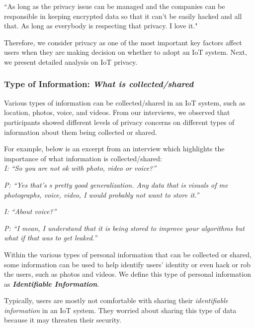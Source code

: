 ``As long as the privacy issue can be managed and the companies can be responsible in keeping encrypted data so that it can't be easily hacked and all that. As long as everybody is respecting that privacy. I love it." 

Therefore, we consider privacy as one of the most important key factors affect users when they are making decision on whether to adopt an IoT system. Next, we present detailed analysis on IoT privacy.

\subsubsection{Type of Information: \textit{What is collected/shared}}
Various types of information can be collected/shared in an IoT system, such as location, photos, voice, and videos. From our interviews, we observed that participants showed different levels of privacy concerns on different types of information about them being collected or shared. 

For example,
below is an excerpt from an interview which highlights the importance of what information is collected/shared:\\

\textit{I: ``So you are not ok with photo, video or voice?''\\}

\textit{P: ``Yes that's s pretty good generalization. Any data that is visuals of me photographs, voice, video, I would probably not want to store it.''\\}

\textit{I: ``About voice?''\\}

\textit{P: ``I mean, I understand that it is being stored to improve your algorithms but what if that was to get leaked.''\\}

Within the various types of personal information that can be collected or shared, some information can be used to help identify users' identity or even hack or rob the users, such as photos and videos. We define this type of personal information as \textbf{\textit{Identifiable Information}}.

Typically, users are mostly not comfortable with sharing their \textit{identifiable information}  in an IoT system. They worried about sharing this type of data because it may threaten their security.

